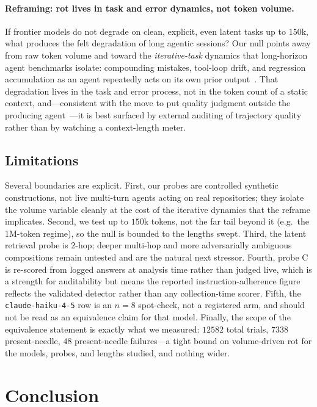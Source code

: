 \documentclass[11pt]{article}
\begin{document}
\paragraph{Reframing: rot lives in task and error dynamics, not token volume.}
If frontier models do not degrade on clean, explicit, even latent tasks up to
$150$k, what produces the felt degradation of long agentic sessions? Our null
points away from raw token volume and toward the \emph{iterative-task} dynamics that
long-horizon agent benchmarks isolate: compounding mistakes, tool-loop drift, and
regression accumulation as an agent repeatedly acts on its own prior
output~\cite{orlanski2026slopcodebench}. That degradation lives in the task and
error process, not in the token count of a static context, and---consistent with the
move to put quality judgment outside the producing agent~\cite{srinivasan2026searchdiscipline}---it
is best surfaced by external auditing of trajectory quality rather than by watching a
context-length meter.

\subsection{Limitations}
\label{sec:limitations-discussion}

Several boundaries are explicit. First, our probes are controlled synthetic
constructions, not live multi-turn agents acting on real repositories; they isolate
the volume variable cleanly at the cost of the iterative dynamics that the reframe
implicates. Second, we test up to $150$k tokens, not the far tail beyond it
(e.g.\ the 1M-token regime), so the null is bounded to the lengths swept. Third, the
latent retrieval probe is $2$-hop; deeper multi-hop and more adversarially ambiguous
compositions remain untested and are the natural next stressor. Fourth, probe C is
re-scored from logged answers at analysis time rather than judged live, which is a
strength for auditability but means the reported instruction-adherence figure
reflects the validated detector rather than any collection-time scorer. Fifth, the
\texttt{claude-haiku-4-5} row is an $n=8$ spot-check, not a registered arm, and
should not be read as an equivalence claim for that model. Finally, the scope of the
equivalence statement is exactly what we measured: $12582$ total trials, $7338$
present-needle, $48$ present-needle failures---a tight bound on volume-driven rot for
the models, probes, and lengths studied, and nothing wider.

\section{Conclusion}
\label{sec:conclusion}
\end{document}
